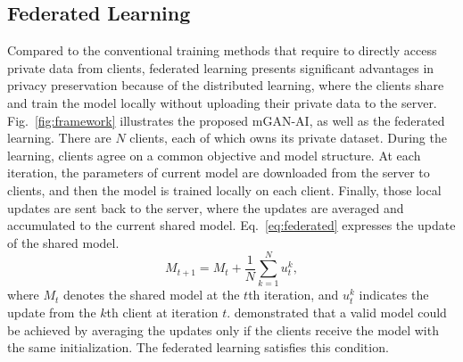 \documentclass[10pt, conference, letterpaper]{IEEEtran}
\newcommand{\alg}{mGAN-AI}
\begin{document}
\subsection{Federated Learning}
\label{sec:fedAvg}
Compared to the conventional training methods that require to directly access private data from clients, federated learning presents significant advantages in privacy preservation because of the distributed learning, where the clients share and train the model locally without uploading their private data to the server.
Fig.~\ref{fig:framework} illustrates the proposed \alg, as well as the federated learning. There are $N$ clients, each of which owns its private dataset. During the learning, clients agree on a common objective and model structure. At each iteration, the parameters of current model are downloaded from the server to clients, and then the model is trained locally on each client. Finally, those local updates are sent back to the server, where the updates are averaged and accumulated to the current shared model. Eq.~\ref{eq:federated} expresses the update of the shared model.
\begin{equation}
M_{t+1} = M_t + \frac{1}{N} \sum_{k=1}^{N}u^k_t,
\label{eq:federated}
\end{equation}
where $M_t$ denotes the shared model at the $t$th iteration, and $u^k_t$ indicates the update from the $k$th client at iteration $t$. %
\cite{mcmahan2016communication} demonstrated that a valid model could be achieved by averaging the updates only if the clients receive the model with the same initialization. The federated learning satisfies this condition.
\end{document}
